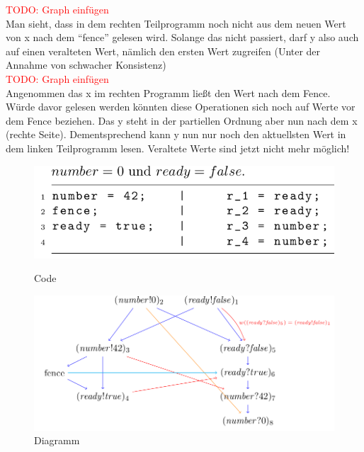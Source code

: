 \documentclass[a4paper,10pt, oneside]{book}
\begin{document}
\textcolor{red}{TODO: Graph einfügen}\\
Man sieht, dass in dem rechten Teilprogramm noch nicht aus dem neuen Wert von x nach dem ``fence'' gelesen wird. Solange das nicht passiert, darf y also auch auf einen veralteten Wert, nämlich den ersten Wert zugreifen (Unter der Annahme von schwacher Konsistenz)\\

\textcolor{red}{TODO: Graph einfügen}\\
Angenommen das x im rechten Programm ließt den Wert nach dem Fence. Würde davor gelesen werden könnten diese Operationen sich noch auf Werte vor dem Fence beziehen. Das y steht in der partiellen Ordnung aber nun nach dem x (rechte Seite). Dementsprechend kann y nun nur noch den aktuellsten Wert in dem linken Teilprogramm lesen. Veraltete Werte sind jetzt nicht mehr möglich!

\begin{figure}[htb]
	
	\begin{minipage}[t]{0.3\linewidth}
		\centering
		\includegraphics[scale=0.3]{fenceCode}
		\caption{Code}
	\end{minipage}
	\hfill
	\begin{minipage}[t]{0.6\linewidth}
		\centering
		\includegraphics[scale=0.3]{fenceDia}
		\caption{Diagramm}
	\end{minipage}
\end{figure}
\end{document}
